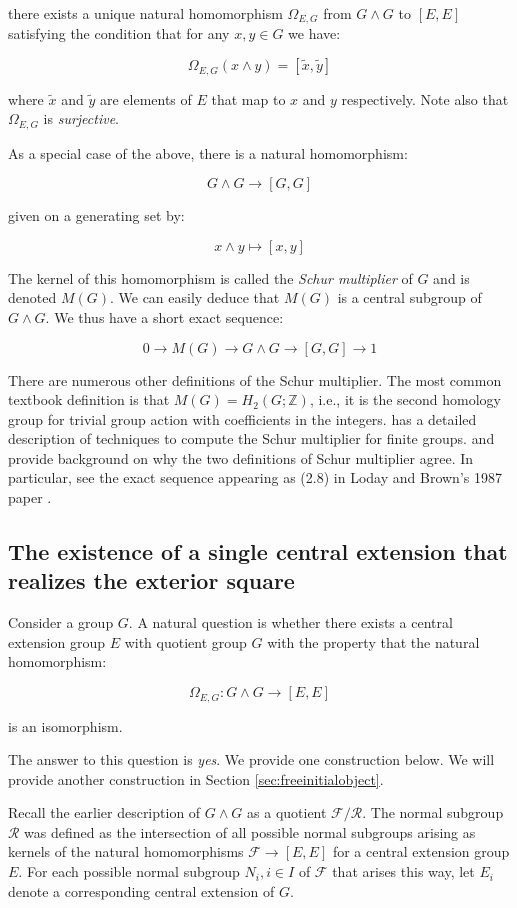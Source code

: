 there exists a unique natural homomorphism $\Omega_{E,G}$ from $G \wedge G$ to
$[E,E]$ satisfying the condition that for any $x,y \in G$ we have:

$$\Omega_{E,G}(x \wedge y) = [\tilde{x},\tilde{y}]$$

where $\tilde{x}$ and $\tilde{y}$ are elements of $E$ that map to $x$
and $y$ respectively. Note also that $\Omega_{E,G}$ is {\em
  surjective}.

As a special case of the above, there is a natural homomorphism:

$$G \wedge G \to [G,G]$$

given on a generating set by:

$$x \wedge y \mapsto [x,y]$$

The kernel of this homomorphism is called the {\em Schur multiplier}
of $G$ and is denoted $M(G)$. We can easily deduce that $M(G)$ is a
central subgroup of $G \wedge G$. We thus have a short exact sequence:

$$0 \to M(G) \to G \wedge G \to [G,G] \to 1$$

There are numerous other definitions of the Schur multiplier. The most
common textbook definition is that $M(G) = H_2(G;\mathbb{Z})$, i.e.,
it is the second homology group for trivial group action with
coefficients in the integers. \cite{Karpilovsky} has a detailed
description of techniques to compute the Schur multiplier for finite
groups. \cite{BrownLoday} and \cite{McDermottThesis} provide
background on why the two definitions of Schur multiplier agree. In
particular, see the exact sequence appearing as (2.8) in Loday and
Brown's 1987 paper \cite{BrownLoday}.

\subsection{The existence of a single central extension that realizes the exterior square}\label{sec:grandcentralproduct}

Consider a group $G$. A natural question is whether there exists a
central extension group $E$ with quotient group $G$ with the property
that the natural homomorphism:

$$\Omega_{E,G}: G \wedge G \to [E,E]$$

is an isomorphism.

The answer to this question is {\em yes}. We provide one construction
below. We will provide another construction in
Section \ref{sec:freeinitialobject}.

Recall the earlier description of $G \wedge G$ as a quotient
$\mathcal{F}/\mathcal{R}$. The normal subgroup $\mathcal{R}$ was
defined as the intersection of all possible normal subgroups arising
as kernels of the natural homomorphisms $\mathcal{F} \to [E,E]$ for a
central extension group $E$. For each possible normal subgroup $N_i, i
\in I$ of $\mathcal{F}$ that arises this way, let $E_i$ denote a
corresponding central extension of $G$.

